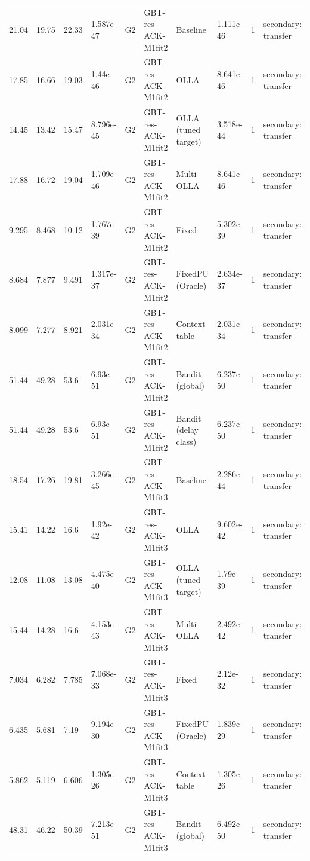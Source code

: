 \documentclass[10pt]{article}
\begin{document}
\begin{landscape}
\begin{longtable}{@{}llllllllll@{}}
21.04 & 19.75 & 22.33 & 1.587e-47 & G2 & GBT-res-ACK-M1fit2 & Baseline & 1.111e-46 & 1 & secondary: transfer \\
17.85 & 16.66 & 19.03 & 1.44e-46 & G2 & GBT-res-ACK-M1fit2 & OLLA & 8.641e-46 & 1 & secondary: transfer \\
14.45 & 13.42 & 15.47 & 8.796e-45 & G2 & GBT-res-ACK-M1fit2 & OLLA (tuned target) & 3.518e-44 & 1 & secondary: transfer \\
17.88 & 16.72 & 19.04 & 1.709e-46 & G2 & GBT-res-ACK-M1fit2 & Multi-OLLA & 8.641e-46 & 1 & secondary: transfer \\
9.295 & 8.468 & 10.12 & 1.767e-39 & G2 & GBT-res-ACK-M1fit2 & Fixed & 5.302e-39 & 1 & secondary: transfer \\
8.684 & 7.877 & 9.491 & 1.317e-37 & G2 & GBT-res-ACK-M1fit2 & FixedPU (Oracle) & 2.634e-37 & 1 & secondary: transfer \\
8.099 & 7.277 & 8.921 & 2.031e-34 & G2 & GBT-res-ACK-M1fit2 & Context table & 2.031e-34 & 1 & secondary: transfer \\
51.44 & 49.28 & 53.6 & 6.93e-51 & G2 & GBT-res-ACK-M1fit2 & Bandit (global) & 6.237e-50 & 1 & secondary: transfer \\
51.44 & 49.28 & 53.6 & 6.93e-51 & G2 & GBT-res-ACK-M1fit2 & Bandit (delay class) & 6.237e-50 & 1 & secondary: transfer \\
18.54 & 17.26 & 19.81 & 3.266e-45 & G2 & GBT-res-ACK-M1fit3 & Baseline & 2.286e-44 & 1 & secondary: transfer \\
15.41 & 14.22 & 16.6 & 1.92e-42 & G2 & GBT-res-ACK-M1fit3 & OLLA & 9.602e-42 & 1 & secondary: transfer \\
12.08 & 11.08 & 13.08 & 4.475e-40 & G2 & GBT-res-ACK-M1fit3 & OLLA (tuned target) & 1.79e-39 & 1 & secondary: transfer \\
15.44 & 14.28 & 16.6 & 4.153e-43 & G2 & GBT-res-ACK-M1fit3 & Multi-OLLA & 2.492e-42 & 1 & secondary: transfer \\
7.034 & 6.282 & 7.785 & 7.068e-33 & G2 & GBT-res-ACK-M1fit3 & Fixed & 2.12e-32 & 1 & secondary: transfer \\
6.435 & 5.681 & 7.19 & 9.194e-30 & G2 & GBT-res-ACK-M1fit3 & FixedPU (Oracle) & 1.839e-29 & 1 & secondary: transfer \\
5.862 & 5.119 & 6.606 & 1.305e-26 & G2 & GBT-res-ACK-M1fit3 & Context table & 1.305e-26 & 1 & secondary: transfer \\
48.31 & 46.22 & 50.39 & 7.213e-51 & G2 & GBT-res-ACK-M1fit3 & Bandit (global) & 6.492e-50 & 1 & secondary: transfer \\

\end{longtable}
\end{landscape}
\end{document}
